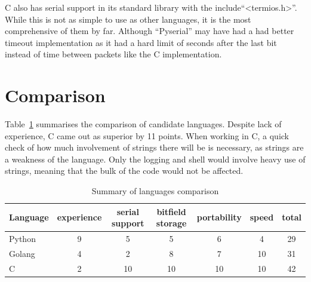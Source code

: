 C also has serial support in its standard library with the include``<termios.h>''. While this is not as simple to use as other languages, it is the most comprehensive of them by far. Although ``Pyserial'' may have had a had better timeout implementation as it had a hard limit of seconds after the last bit instead of time between packets like the C implementation.

\section*{Comparison}
Table~\ref{table:language_comparison} summarises the comparison of candidate languages. Despite lack of experience, C came out as superior by 11 points. When working in C, a quick check of how much involvement of strings there will be is necessary, as strings are a weakness of the language. Only the logging and shell would involve heavy use of strings, meaning that the bulk of the code would not be affected.

\begin{table}[h!]
\centering
\begin{tabular}{|l| c c c c c |c|} 
 \hline
 Language & experience & serial support & bitfield storage & portability & speed & total\\
 \hline\hline
  Python & 9 & 5 & 5 & 6 & 4 & 29 \\
 \hline
 Golang  & 4 &  2 &  8 &  7 & 10 & 31\\
 \hline
 C       & 2 & 10 & 10 & 10 & 10 & 42\\
\hline
\end{tabular}
\caption{Summary of languages comparison}
\label{table:language_comparison}
\end{table}


